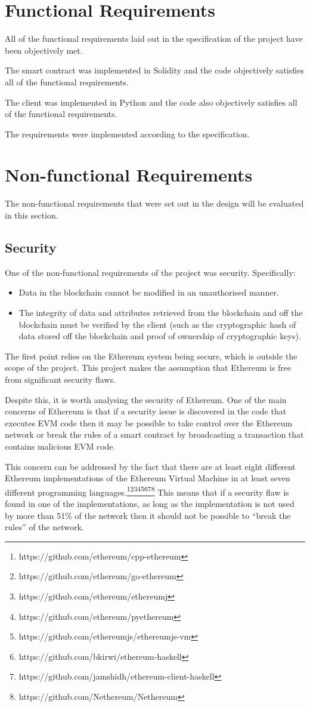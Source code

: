 \documentclass[12pt]{report}
\begin{document}
	\section{Functional Requirements}
	All of the functional requirements laid out in the specification of the project have been objectively met.
	
	The smart contract was implemented in Solidity and the code objectively satisfies all of the functional requirements.
	
	The client was implemented in Python and the code also objectively satisfies all of the functional requirements.
	
	The requirements were implemented according to the specification.
	\section{Non-functional Requirements}
	The non-functional requirements that were set out in the design will be evaluated in this section.
	
	\subsection{Security}
	One of the non-functional requirements of the project was security. Specifically:
	\begin{itemize}
		\item Data in the blockchain cannot be modified in an unauthorised manner.
		\item The integrity of data and attributes retrieved from the blockchain and off the blockchain must be verified by the client (such as the cryptographic hash of data stored off the blockchain and proof of ownership of cryptographic keys).
	\end{itemize}
	
	The first point relies on the Ethereum system being secure, which is outside the scope of the project. This project makes the assumption that Ethereum is free from significant security flaws.
	
	Despite this, it is worth analysing the security of Ethereum. One of the main concerns of Ethereum is that if a security issue is discovered in the code that executes EVM code then it may be possible to take control over the Ethereum network or break the rules of a smart contract by broadcasting a transaction that contains malicious EVM code.
	
	This concern can be addressed by the fact that there are at least eight different Ethereum implementations of the Ethereum Virtual Machine in at least seven different programming languages.\footnote{https://github.com/ethereum/cpp-ethereum}\footnote{https://github.com/ethereum/go-ethereum}\footnote{https://github.com/ethereum/ethereumj}\footnote{https://github.com/ethereum/pyethereum}\footnote{https://github.com/ethereumjs/ethereumjs-vm}\footnote{https://github.com/bkirwi/ethereum-haskell}\footnote{https://github.com/jamshidh/ethereum-client-haskell}\footnote{https://github.com/Nethereum/Nethereum} This means that if a security flaw is found in one of the implementations, as long as the implementation is not used by more than 51\% of the network then it should not be possible to ``break the rules'' of the network.
	
\end{document}
